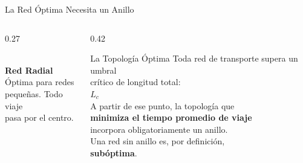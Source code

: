 \begin{frame}{La Red Óptima Necesita un Anillo}
  \begin{columns}[c]
    \begin{column}{0.27\textwidth}
      \centering
      \\[0.2cm]
      {\small\bfseries\color{ColorPrincipal} Red Radial}\\[0.08cm]
      {\scriptsize Óptima para redes\\
        pequeñas. Todo viaje\\
        pasa por el centro.}
    \end{column}
    \begin{column}{0.42\textwidth}
      \begin{exampleblock}{La Topología Óptima}
        \centering
        {\scriptsize Toda red de transporte supera un umbral\\
          crítico de longitud total:}\\[0.12cm]
        {\LARGE\bfseries\color{ColorAcento} $L_c$}\\[0.12cm]
        {\scriptsize
          A partir de ese punto, la topología que\\
          \textbf{minimiza el tiempo promedio de viaje}\\
          incorpora obligatoriamente un anillo.\\[0.1cm]
          Una red sin anillo es, por definición,\\
          \textbf{subóptima}.}\\[0.12cm]
        {\scriptsize\itshape\citet{aldous2019optimal}}
      \end{exampleblock}

\end{column}
\end{columns}
\end{frame}
